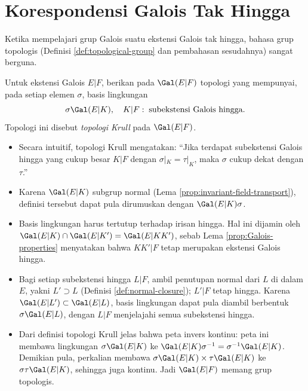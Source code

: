 \section{Korespondensi Galois Tak Hingga}\label{sec:inf-Galois}
Ketika mempelajari grup Galois suatu ekstensi Galois tak hingga, bahasa grup topologis (Definisi \ref{def:topological-group} dan pembahasan sesudahnya) sangat berguna.
\begin{definition}\label{def:Krull-topology} 
	Untuk ekstensi Galois $E|F$, berikan pada $\Gal(E|F)$ topologi yang mempunyai, pada setiap elemen $\sigma$, basis lingkungan
	\[ \sigma\Gal(E|K), \quad K|F: \;\text{subekstensi Galois hingga}. \]
	Topologi ini disebut \emph{topologi Krull} pada $\Gal(E|F)$.
\end{definition}

\begin{itemize}
	\item Secara intuitif, topologi Krull mengatakan: ``Jika terdapat subekstensi Galois hingga yang cukup besar $K|F$ dengan $\sigma|_K=\tau|_K$, maka $\sigma$ cukup dekat dengan $\tau$.''
	\item Karena $\Gal(E|K)$ subgrup normal (Lema \ref{prop:invariant-field-transport}), definisi tersebut dapat pula dirumuskan dengan $\Gal(E|K)\sigma$.
	\item Basis lingkungan harus tertutup terhadap irisan hingga. Hal ini dijamin oleh $\Gal(E|K)\cap\Gal(E|K')=\Gal(E|KK')$, sebab Lema \ref{prop:Galois-properties} menyatakan bahwa $KK'|F$ tetap merupakan ekstensi Galois hingga.
	\item Bagi setiap subekstensi hingga $L|F$, ambil penutupan normal dari $L$ di dalam $E$, yakni $L' \supset L$ (Definisi \ref{def:normal-closure}); $L'|F$ tetap hingga. Karena $\Gal(E|L') \subset \Gal(E|L)$, basis lingkungan dapat pula diambil berbentuk $\sigma \Gal(E|L)$, dengan $L|F$ menjelajahi semua subekstensi hingga.
	\item Dari definisi topologi Krull jelas bahwa peta invers kontinu: peta ini membawa lingkungan $\sigma\Gal(E|K)$ ke $\Gal(E|K)\sigma^{-1}=\sigma^{-1}\Gal(E|K)$. Demikian pula, perkalian membawa $\sigma\Gal(E|K)\times\tau\Gal(E|K)$ ke $\sigma\tau\Gal(E|K)$, sehingga juga kontinu. Jadi $\Gal(E|F)$ memang grup topologis.
\end{itemize}

